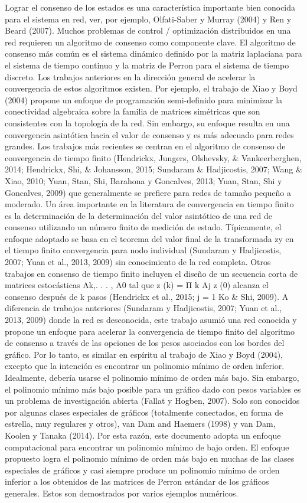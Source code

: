 \documentclass{article}
\begin{document}
\newpage

Lograr el consenso de los estados es una característica importante bien conocida para el sistema en red, ver, por ejemplo, Olfati-Saber y Murray (2004) y Ren y Beard (2007). Muchos problemas de control / optimización distribuidos en una red requieren un algoritmo de consenso como componente clave. El algoritmo de consenso más común es el sistema dinámico definido por la matriz laplaciana para el sistema de tiempo continuo y la matriz de Perron para el sistema de tiempo discreto. Los trabajos anteriores en la dirección general de acelerar la convergencia de estos algoritmos existen. Por ejemplo, el trabajo de Xiao y Boyd (2004) propone un enfoque de programación semi-definido para minimizar la conectividad algebraica sobre la familia de matrices simétricas que son consistentes con la topología de la red. Sin embargo, su enfoque resulta en una convergencia asintótica hacia el valor de consenso y es más adecuado para redes grandes. Los trabajos más recientes se centran en el algoritmo de consenso de convergencia de tiempo finito (Hendrickx, Jungers, Olshevsky, \& Vankeerberghen, 2014; Hendrickx, Shi, \& Johansson, 2015; Sundaram \& Hadjicostis, 2007; Wang \& Xiao, 2010; Yuan, Stan, Shi, Barahona y Goncalves, 2013; Yuan, Stan, Shi y Goncalves, 2009) que generalmente se prefiere para redes de tamaño pequeño a moderado. Un área importante en la literatura de convergencia en tiempo finito es la determinación de la determinación del valor asintótico de una red de consenso utilizando un número finito de medición de estado. Típicamente, el enfoque adoptado se basa
en el teorema del valor final de la transformada zy en el tiempo finito
convergencia para nodo individual (Sundaram y Hadjicostis, 2007;
Yuan et al., 2013, 2009) sin conocimiento de la red completa.
Otros trabajos en consenso de tiempo finito incluyen el diseño de un
secuencia corta de matrices estocásticas Ak,. . . , A0 tal que z (k) =
Π k Aj z (0) alcanza el consenso después de k pasos (Hendrickx et al., 2015; j = 1
Ko \& Shi, 2009).
A diferencia de trabajos anteriores (Sundaram y Hadjicostis, 2007; Yuan et al.,
2013, 2009) donde la red es desconocida, este trabajo asumió una red conocida y propone un enfoque para acelerar la convergencia de tiempo finito del algoritmo de consenso a través de las opciones de los pesos asociados con los bordes del gráfico. Por lo tanto, es similar en espíritu al trabajo de Xiao y Boyd (2004), excepto que la intención es encontrar un polinomio mínimo de orden inferior. Idealmente, debería usarse el polinomio mínimo de orden más bajo. Sin embargo, el polinomio mínimo más bajo posible para un gráfico dado con pesos variables es un problema de investigación abierta (Fallat y Hogben, 2007). Solo son conocidos por algunas clases especiales de gráficos (totalmente conectados, en forma de estrella, muy regulares y otros), van Dam and Haemers (1998) y van Dam, Koolen y Tanaka (2014). Por esta razón, este documento adopta un enfoque computacional para encontrar un polinomio mínimo de bajo orden. El enfoque propuesto logra el polinomio mínimo de orden más bajo en muchas de las clases especiales de gráficos y casi siempre produce un polinomio mínimo de orden inferior a los obtenidos de las matrices de Perron estándar de los gráficos generales. Estos son demostrados por varios ejemplos numéricos.
\end{document}
